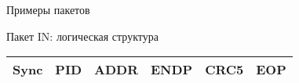 \begin{frame}{Примеры пакетов}%

\begin{minipage}{7cm}
\begin{block}{Пакет IN: логическая структура}
\begin{table}[h]
\begin{tabular}{@{}cccccc@{}}
\toprule
Sync & PID & ADDR & ENDP & CRC5 & EOP\\\bottomrule
\end{tabular}
\end{table}
\end{block}
\end{minipage}

\vspace{.4cm}
\pause
{}
\end{frame}


